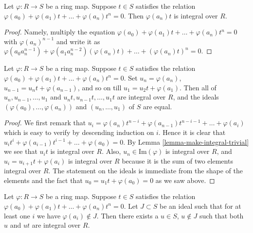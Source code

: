\begin{lemma}
\label{lemma-make-integral-trivial}
Let $\varphi : R \to S$ be a ring map.
Suppose $t \in S$ satisfies the
relation $\varphi(a_0) + \varphi(a_1)t + \ldots + \varphi(a_n) t^n = 0$.
Then $\varphi(a_n)t$ is integral over $R$.
\end{lemma}

\begin{proof}
Namely, multiply the equation
$\varphi(a_0) + \varphi(a_1)t + \ldots + \varphi(a_n) t^n = 0$
with $\varphi(a_n)^{n-1}$ and write it as
$\varphi(a_0 a_n^{n-1}) +
\varphi(a_1 a_n^{n-2}) (\varphi(a_n)t) +
\ldots +
(\varphi(a_n) t)^n = 0$.
\end{proof}

\begin{lemma}
\label{lemma-make-integral-less-trivial}
Let $\varphi : R \to S$ be a ring map.
Suppose $t \in S$ satisfies the
relation $\varphi(a_0) + \varphi(a_1)t + \ldots + \varphi(a_n) t^n = 0$.
Set $u_n = \varphi(a_n)$, $u_{n-1} = u_n t + \varphi(a_{n-1})$,
and so on till $u_1 = u_2 t + \varphi(a_1)$.
Then all of $u_n, u_{n-1}, \ldots, u_1$ and
$u_nt, u_{n-1}t, \ldots, u_1t$ are integral over $R$,
and the ideals $(\varphi(a_0), \ldots, \varphi(a_n))$ and
$(u_n, \ldots, u_1)$ of $S$ are equal.
\end{lemma}

\begin{proof}
We first remark that $u_{i} =
\varphi(a_n)t^{n-i} + \varphi(a_{n-1})t^{n-i-1} + \ldots + \varphi(a_{i})$
which is easy to verify by descending induction on $i$. Hence it
is clear that $u_{i}t^{i} + \varphi(a_{i-1})t^{i-1} +
\ldots + \varphi(a_0) = 0$.
By Lemma \ref{lemma-make-integral-trivial}
we see that $u_it$ is integral over $R$.
Also, $u_n \in \text{Im}(\varphi)$ is integral over
$R$, and $u_i = u_{i + 1}t + \varphi(a_i)$ is integral over $R$
because it is the sum of two elements integral over $R$.
The statement on the ideals is immediate from the
shape of the elements and the fact that
$u_0 = u_1t + \varphi(a_0) = 0$ as we saw above.
\end{proof}

\begin{lemma}
\label{lemma-make-integral-not-in-ideal}
Let $\varphi : R \to S$ be a ring map.
Suppose $t \in S$ satisfies the
relation $\varphi(a_0) + \varphi(a_1)t + \ldots + \varphi(a_n) t^n = 0$.
Let $J \subset S$ be an ideal such that for at
least one $i$ we have $\varphi(a_i) \not \in J$.
Then there exists a $u \in S$, $u \not\in J$ such
that both $u$ and $ut$ are integral over $R$.
\end{lemma}

